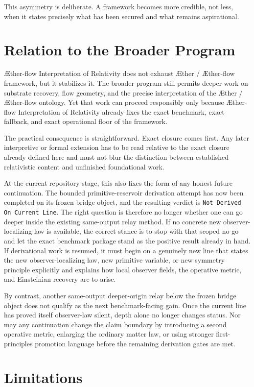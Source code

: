 \documentclass[11pt]{article}
\newcommand{\Aether}{\AE{}ther}
\newcommand{\Aflow}{\AE{}ther-flow}
\newcommand{\TheoryName}{\Aflow{} Interpretation of Relativity}
\newcommand{\TheoryProgram}{\Aether{} / \Aflow{} framework}
\begin{document}
This asymmetry is deliberate. A framework becomes more credible, not less, when it states precisely what has been secured and what remains aspirational.

\section{Relation to the Broader Program}

\TheoryName{} does not exhaust \TheoryProgram{}, but it stabilizes it. The broader program still permits deeper work on substrate recovery, flow geometry, and the precise interpretation of the \Aether{} / \Aflow{} ontology. Yet that work can proceed responsibly only because \TheoryName{} already fixes the exact benchmark, exact fallback, and exact operational floor of the framework.

The practical consequence is straightforward. Exact closure comes first. Any later interpretive or formal extension has to be read relative to the exact closure already defined here and must not blur the distinction between established relativistic content and unfinished foundational work.

At the current repository stage, this also fixes the form of any honest future continuation. The bounded primitive-reservoir derivation attempt has now been completed on its frozen bridge object, and the resulting verdict is \texttt{Not Derived On Current Line}. The right question is therefore no longer whether one can go deeper inside the existing same-output relay method. If no concrete new observer-localizing law is available, the correct stance is to stop with that scoped no-go and let the exact benchmark package stand as the positive result already in hand. If derivational work is resumed, it must begin on a genuinely new line that states the new observer-localizing law, new primitive variable, or new symmetry principle explicitly and explains how local observer fields, the operative metric, and Einsteinian recovery are to arise.

By contrast, another same-output deeper-origin relay below the frozen bridge object does not qualify as the next benchmark-facing gain. Once the current line has proved itself observer-law silent, depth alone no longer changes status. Nor may any continuation change the claim boundary by introducing a second operative metric, enlarging the ordinary matter law, or using stronger first-principles promotion language before the remaining derivation gates are met.

\section{Limitations}
\end{document}
